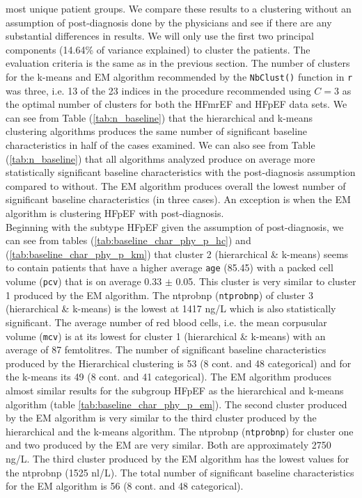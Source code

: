 \documentclass[../thesis.tex]{subfiles}
\begin{document}
\noindent most unique patient groups. We compare these results to a clustering without an assumption of post-diagnosis done by the physicians and see if there are any substantial differences in results. We will only use the first two principal components (14.64\% of variance explained) to cluster the patients. The evaluation criteria is the same as in the previous section. The number of clusters for the k-means and EM algorithm recommended by the \texttt{NbClust()} \citep{nbclust} function in \texttt{r} was three, i.e. 13 of the 23 indices in the procedure recommended using $C = 3$ as the optimal number of clusters for both the HFmrEF and HFpEF data sets. We can see from Table (\ref{tab:n_baseline}) that the hierarchical and k-means clustering algorithms produces the same number of significant baseline characteristics in half of the cases examined.  We can also see from Table (\ref{tab:n_baseline}) that all algorithms analyzed produce on average more statistically significant baseline characteristics with the post-diagnosis assumption compared to without. The EM algorithm produces overall the lowest number of significant baseline characteristics (in three cases). An exception is when the EM algorithm is clustering HFpEF with post-diagnosis.\\ 
\indent Beginning with the subtype HFpEF given the assumption of post-diagnosis, we can see from tables (\ref{tab:baseline_char_phy_p_hc}) and (\ref{tab:baseline_char_phy_p_km}) that cluster 2 (hierarchical \& k-means) seems to contain patients that have a higher average \texttt{age} (85.45) with a packed cell volume (\texttt{pcv}) that is on average 0.33 $\pm$ 0.05. This cluster is very similar to cluster 1 produced by the EM algorithm. The ntprobnp (\texttt{ntprobnp}) of cluster 3 (hierarchical \& k-means) is the lowest at 1417 ng/L which is also statistically significant. The average number of red blood cells, i.e. the mean corpusular volume (\texttt{mcv}) is at its lowest for cluster 1 (hierarchical \& k-means) with an average of 87 femtolitres. The number of significant baseline characteristics produced by the Hierarchical clustering is 53 (8 cont. and 48 categorical) and for the k-means its 49 (8 cont. and 41 categorical). The EM algorithm produces almost similar results for the subgroup HFpEF as the hierarchical and k-means algorithm (table \ref{tab:baseline_char_phy_p_em}). The second cluster produced by the EM algorithm is very similar to the third cluster produced by the hierarchical and the k-means algorithm. The ntprobnp (\texttt{ntprobnp}) for cluster one and two produced by the EM are very similar. Both are approximately 2750 ng/L. The third cluster produced by the EM algorithm has the lowest values for the ntprobnp (1525 nl/L). The total number of significant baseline characteristics for the EM algorithm is 56 (8 cont. and 48 categorical). \\ 
\end{document}
